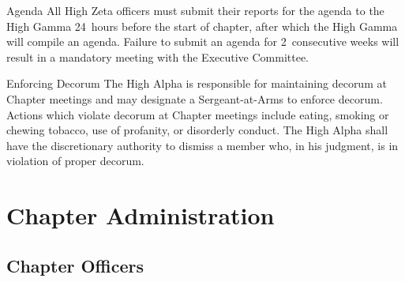 \documentclass{article}
\begin{document}
\begin{subsubsectionList}
  \item {\titleStyle Agenda\titleSuffix}
  All High Zeta officers must submit their reports for the agenda to the High
  Gamma 24~hours before the start of chapter, after which the High Gamma will
  compile an agenda. Failure to submit an agenda for 2~consecutive weeks will
  result in a mandatory meeting with the Executive Committee.

  \item {\titleStyle Enforcing Decorum\titleSuffix}
  The High Alpha is responsible for maintaining decorum at Chapter meetings and
  may designate a Sergeant-at-Arms to enforce decorum. Actions which violate
  decorum at Chapter meetings include eating, smoking or chewing tobacco, use of
  profanity, or disorderly conduct. The High Alpha shall have the discretionary
  authority to dismiss a member who, in his judgment, is in violation of proper
  decorum.
\end{subsubsectionList}

\section{Chapter Administration}

\subsection{Chapter Officers}
\end{document}
